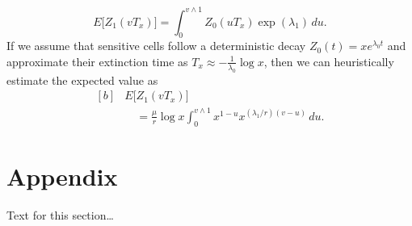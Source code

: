 \documentclass{bmcart}
\begin{document}
%
\[
E \bigl[Z_1(vT_x) \bigr]=
\int_0^{v\wedge
1}Z_0(uT_x)
\exp (\lambda_1)\,du .
\]
%
If we assume that sensitive cells follow a deterministic decay
$Z_0(t)=xe^{\lambda_0 t}$ and approximate their extinction time as
$T_x\approx-\frac{1}{\lambda_0}\log x$, then we can heuristically
estimate the expected value as
%
\begin{equation}\label{eqexpmuts}
\begin{aligned}[b]
&      E\bigl[Z_1(vT_x)\bigr]\\
&\quad      = \frac{\mu}{r}\log x
\int_0^{v\wedge1}x^{1-u}x^{({\lambda_1}/{r})(v-u)}\,du .
\end{aligned}
\end{equation}



\section*{Appendix}
Text for this section\ldots

\end{document}
